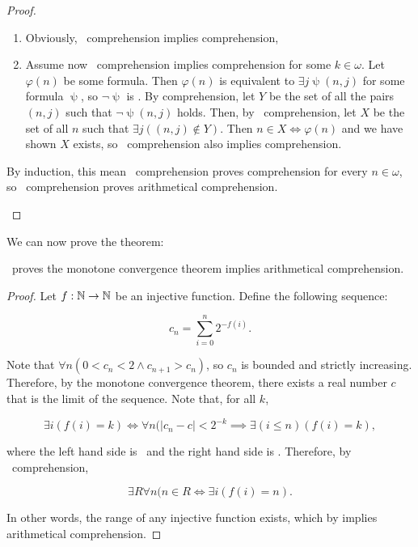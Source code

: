 \documentclass[../main.tex]{memoir}
\begin{document}
\begin{proof}
\begin{description}
    \begin{enumerate}
    \item Obviously, \re\ comprehension implies  comprehension,
    \item Assume now \re\ comprehension implies  comprehension for some $k \in \omega$. Let $\varphi(n)$ be some  formula. Then $\varphi(n)$ is equivalent to $\exists j \uppsi(n, j)$ for some  formula $\uppsi$, so $\neg \uppsi$ is . By  comprehension, let $Y$ be the set of all the pairs $(n, j)$ such that $\neg \uppsi(n, j)$ holds. Then, by \re\ comprehension, let $X$ be the set of all $n$ such that $\exists j ((n, j) \not\in Y)$. Then $n \in X \iff \varphi(n)$ and we have shown $X$ exists, so \re\ comprehension also implies  comprehension.
    \end{enumerate}

    By induction, this mean \re\ comprehension proves  comprehension for every $n \in \omega$, so \re\ comprehension proves arithmetical comprehension.
  \end{description}
\end{proof}

We can now prove the theorem:

\begin{theorem}
  \label{thm:mc-aca}
  \rca\ proves the monotone convergence theorem implies arithmetical comprehension.
\end{theorem}
\begin{proof}
  Let $f:\mathbb{N} \to \mathbb{N}$ be an injective function. Define the following sequence:

  \[ c_n = \sum_{i = 0}^n 2^{-f(i)}. \]

  Note that $\forall n (0 < c_n < 2 \land c_{n + 1} > c_n)$, so $c_n$ is bounded and strictly increasing. Therefore, by the monotone convergence theorem, there exists a real number $c$ that is the limit of the sequence. Note that, for all $k$,

  \[ \exists i (f(i) = k) \iff \forall n (|c_n - c| < 2^{-k} \implies \exists (i \le n) (f(i) = k), \]

  where the left hand side is \re\ and the right hand side is \core. Therefore, by \rec\ comprehension,

  \[ \exists R \forall n (n \in R \iff \exists i (f(i) = n). \]

  In other words, the range of any injective function exists, which by  implies arithmetical comprehension.
\end{proof}
\end{document}
